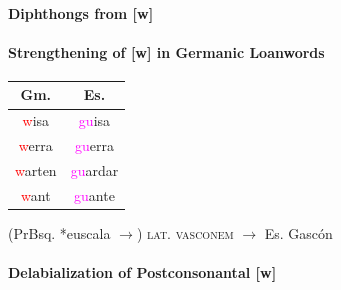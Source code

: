 \documentclass{report}[12pt]
\begin{document}
\paragraph{Diphthongs from [w]}

\paragraph{Strengthening of [w] in Germanic Loanwords}

\begin{center}
  \begin{tabular}{c c}
    Gm. & Es. \\  
    \hline
    \textcolor{red}{w}isa & \textcolor{magenta}{gu}isa \\
    \textcolor{red}{w}erra & \textcolor{magenta}{gu}erra \\
    \textcolor{red}{w}arten & \textcolor{magenta}{gu}ardar \\
    \textcolor{red}{w}ant & \textcolor{magenta}{gu}ante \\  
  \end{tabular}
\end{center}

(PrBsq. *euscala $\rightarrow$) \textsc{lat.} \textsc{vasconem} $\rightarrow$ Es. Gasc\'{o}n

\paragraph{Delabialization of Postconsonantal [w]}
\end{document}
